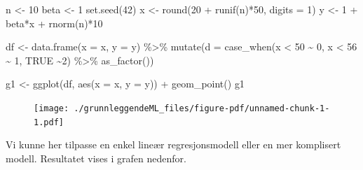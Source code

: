 \documentclass[
  letterpaper,
  DIV=11,
  numbers=noendperiod]{scrreprt}
\newenvironment{Shaded}{\begin{snugshade}}{\end{snugshade}}
\newcommand{\AttributeTok}[1]{\textcolor[rgb]{0.40,0.45,0.13}{#1}}
\newcommand{\ConstantTok}[1]{\textcolor[rgb]{0.56,0.35,0.01}{#1}}
\newcommand{\DecValTok}[1]{\textcolor[rgb]{0.68,0.00,0.00}{#1}}
\newcommand{\FunctionTok}[1]{\textcolor[rgb]{0.28,0.35,0.67}{#1}}
\newcommand{\NormalTok}[1]{\textcolor[rgb]{0.00,0.23,0.31}{#1}}
\newcommand{\OtherTok}[1]{\textcolor[rgb]{0.00,0.23,0.31}{#1}}
\newcommand{\SpecialCharTok}[1]{\textcolor[rgb]{0.37,0.37,0.37}{#1}}
\theoremstyle{definition}
\theoremstyle{remark}
\begin{document}
\begin{Shaded}
\begin{Highlighting}[]
\NormalTok{n }\OtherTok{\textless{}{-}} \DecValTok{10}
\NormalTok{beta }\OtherTok{\textless{}{-}} \DecValTok{1}
\FunctionTok{set.seed}\NormalTok{(}\DecValTok{42}\NormalTok{)}
\NormalTok{x }\OtherTok{\textless{}{-}} \FunctionTok{round}\NormalTok{(}\DecValTok{20} \SpecialCharTok{+} \FunctionTok{runif}\NormalTok{(n)}\SpecialCharTok{*}\DecValTok{50}\NormalTok{, }\AttributeTok{digits =} \DecValTok{1}\NormalTok{)}
\NormalTok{y }\OtherTok{\textless{}{-}} \DecValTok{1} \SpecialCharTok{+}\NormalTok{ beta}\SpecialCharTok{*}\NormalTok{x }\SpecialCharTok{+} \FunctionTok{rnorm}\NormalTok{(n)}\SpecialCharTok{*}\DecValTok{10}

\NormalTok{df }\OtherTok{\textless{}{-}} \FunctionTok{data.frame}\NormalTok{(}\AttributeTok{x =}\NormalTok{ x, }\AttributeTok{y =}\NormalTok{ y) }\SpecialCharTok{\%\textgreater{}\%} 
  \FunctionTok{mutate}\NormalTok{(}\AttributeTok{d =} \FunctionTok{case\_when}\NormalTok{(x }\SpecialCharTok{\textless{}} \DecValTok{50} \SpecialCharTok{\textasciitilde{}} \DecValTok{0}\NormalTok{,}
\NormalTok{                       x }\SpecialCharTok{\textless{}} \DecValTok{56} \SpecialCharTok{\textasciitilde{}} \DecValTok{1}\NormalTok{, }
                       \ConstantTok{TRUE} \SpecialCharTok{\textasciitilde{}}\DecValTok{2}\NormalTok{) }\SpecialCharTok{\%\textgreater{}\%} \FunctionTok{as\_factor}\NormalTok{())}


\NormalTok{g1 }\OtherTok{\textless{}{-}} \FunctionTok{ggplot}\NormalTok{(df, }\FunctionTok{aes}\NormalTok{(}\AttributeTok{x =}\NormalTok{ x, }\AttributeTok{y =}\NormalTok{ y)) }\SpecialCharTok{+}
  \FunctionTok{geom\_point}\NormalTok{() }
\NormalTok{g1}
\end{Highlighting}
\end{Shaded}

\begin{figure}[H]

{\centering \texttt{[image: ./grunnleggendeML\_files/figure-pdf/unnamed-chunk-1-1.pdf]}

}

\end{figure}

Vi kunne her tilpasse en enkel lineær regresjonsmodell eller en mer
komplisert modell. Resultatet vises i grafen nedenfor.
\end{document}
